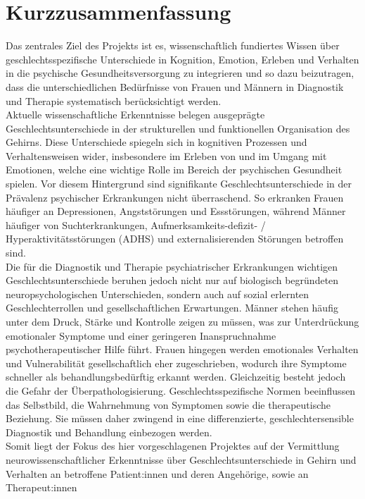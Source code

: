 \documentclass[11pt,a4paper]{article}
\begin{document}
\section*{Kurzzusammenfassung} 
Das zentrales Ziel des Projekts ist es, wissenschaftlich fundiertes Wissen über geschlechtsspezifische Unterschiede in Kognition, 
Emotion, Erleben und Verhalten in die psychische Gesundheitsversorgung zu integrieren und so dazu beizutragen, dass die unterschiedlichen 
Bedürfnisse von Frauen und Männern in Diagnostik und Therapie systematisch berücksichtigt werden.\\
Aktuelle wissenschaftliche Erkenntnisse belegen ausgeprägte Geschlechtsunterschiede in der strukturellen und funktionellen
Organisation des Gehirns. Diese Unterschiede spiegeln sich in kognitiven Prozessen und Verhaltensweisen wider, insbesondere im 
Erleben von und im Umgang mit Emotionen, welche eine wichtige Rolle im Bereich der psychischen Gesundheit spielen.
Vor diesem Hintergrund sind signifikante Geschlechtsunterschiede in der Prävalenz psychischer Erkrankungen nicht überraschend. 
So erkranken Frauen häufiger an Depressionen, Angststörungen und Essstörungen, während Männer häufiger von 
Suchterkrankungen, Aufmerksamkeits-defizit- / Hyperaktivitätsstörungen (ADHS) und externalisierenden 
Störungen betroffen sind.\\ 
Die für die Diagnostik und Therapie psychiatrischer Erkrankungen wichtigen Geschlechtsunterschiede beruhen jedoch 
nicht nur auf biologisch begründeten neuropsychologischen Unterschieden, sondern auch auf sozial erlernten Geschlechterrollen und gesellschaftlichen Erwartungen. Männer stehen häufig
unter dem Druck, Stärke und Kontrolle zeigen zu müssen, was zur Unterdrückung emotionaler Symptome und einer geringeren Inanspruchnahme 
psychotherapeutischer Hilfe führt. Frauen hingegen werden emotionales Verhalten und Vulnerabilität gesellschaftlich eher zugeschrieben, 
wodurch ihre Symptome schneller als behandlungsbedürftig erkannt werden. Gleichzeitig besteht jedoch die Gefahr der Überpathologisierung. 
Geschlechtsspezifische Normen beeinflussen das Selbstbild, die Wahrnehmung von Symptomen sowie die 
therapeutische Beziehung. Sie müssen daher zwingend in eine differenzierte, geschlechtersensible Diagnostik und 
Behandlung einbezogen werden.\\
Somit liegt der Fokus des hier vorgeschlagenen Projektes auf der Vermittlung neurowissenschaftlicher Erkenntnisse über 
Geschlechtsunterschiede in Gehirn und Verhalten an betroffene Patient:innen und deren Angehörige, sowie an Therapeut:innen 
\end{document}
